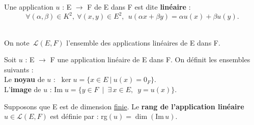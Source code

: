 \vspace{0.5cm}

\noindent Une application $u$ : E \(\to\) F de E dans F est dite \textbf{linéaire} \ssi :\vspace{-0.3cm}\\
\[ \forall (\alpha, \beta)\in K^2,\ \forall(x,y)\in E^2,\ \ u(\alpha x+ \beta y)= \alpha u(x)+ \beta u(y). \] \vspace{-0.5cm} \\
\begin{small}
    On note $\,\mathscr{L}(E,F)$ l'ensemble des applications linéaires de E dans F.
\end{small}

\vspace{1.4cm}

Soit $u$ : E \(\to\) F une application linéaire de E dans F. On définit les ensembles suivants : \\
Le \textbf{noyau} de $u$ : \(\ \ker  u= \bigl\{ x\in E \ | \ u(x)=0_F\bigr\}. \) \vspace{0.1cm} \\
L'\textbf{image} de $u$ :\hspace{0.34cm} Im\(\; u = \bigl\{y\in F\ \mid \ \exists\, x\in E, \ \;y=u(x) \bigr\}. \)

\vspace{1.3cm}

Supposons que E est de dimension \underline{finie}. Le \textbf{rang de l'application linéaire} \(u\in \mathscr{L}(E,F)\) est définie par : rg\((u)=\dim(\text{Im}\,u) \).

\vspace{1.3cm}

